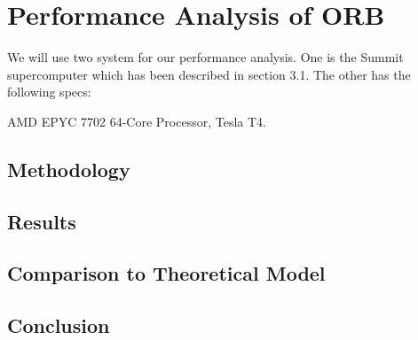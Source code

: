 \documentclass[]{article}
\begin{document}
\newpage
\section{Performance Analysis of ORB}

We will use two system for our performance analysis. One is the Summit supercomputer which has been described in section 3.1. The other has the following specs:


AMD EPYC 7702 64-Core Processor, Tesla T4.


\subsection{Methodology}

\subsection{Results}


\begin{comment}
	\begin{figure}[H]
		\begin{center}
			\begin{tikzpicture}
				\begin{axis}[
					height=10cm,width=13cm, 
					title={Measured Performance with $d = 1024$},
					xlabel={Particle Count},
					ylabel={Execution Time (ms)},
					]
					
					\foreach \i in {0,...,3}{
						\pgfmathsetmacro\suffix{int(pow(2,\i))};
						
						\addplot +[] 
						table [col sep=comma, x=N, y=time] 
						{../../code/out/measurements\suffix.csv};
						
						\addlegendentryexpanded{\# $\suffix$};
						
					}	
				\end{axis}
			\end{tikzpicture}
		\end{center}
	\end{figure}
\end{comment}


\subsection{Comparison to Theoretical Model}


\subsection{Conclusion}


%

\end{document}
